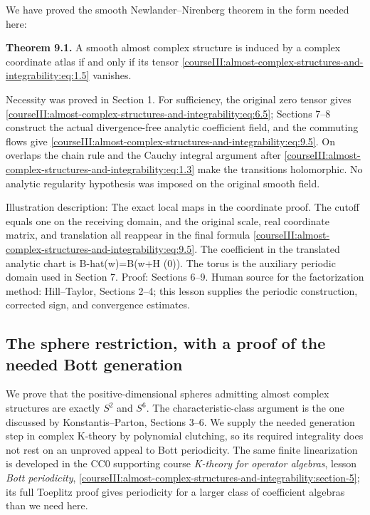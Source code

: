 We have proved the smooth Newlander--Nirenberg theorem in the form needed here:

\textbf{Theorem 9.1.} A smooth almost complex structure is induced by a complex coordinate atlas if and only if its tensor \eqref{courseIII:almost-complex-structures-and-integrability:eq:1.5} vanishes.

Necessity was proved in Section 1. For sufficiency, the original zero tensor gives \eqref{courseIII:almost-complex-structures-and-integrability:eq:6.5}; Sections 7--8 construct the actual divergence-free analytic coefficient field, and the commuting flows give \eqref{courseIII:almost-complex-structures-and-integrability:eq:9.5}. On overlaps the chain rule and the Cauchy integral argument after \eqref{courseIII:almost-complex-structures-and-integrability:eq:1.3} make the transitions holomorphic. No analytic regularity hypothesis was imposed on the original smooth field.

\label{courseIII:almost-complex-structures-and-integrability:integrability-map-figure-style-min-width:900px-max-width:none-width:900px}
Illustration description: The exact local maps in the coordinate proof. The cutoff equals one on the receiving domain, and the original scale, real coordinate matrix, and translation all reappear in the final formula \eqref{courseIII:almost-complex-structures-and-integrability:eq:9.5}. The coefficient in the translated analytic chart is B-hat(w)=B(w+H (0)). The torus is the auxiliary periodic domain used in Section 7. Proof: Sections 6--9. Human source for the factorization method: Hill--Taylor, Sections 2--4; this lesson supplies the periodic construction, corrected sign, and convergence estimates.

\subsection{The sphere restriction, with a proof of the needed Bott generation}
\label{courseIII:almost-complex-structures-and-integrability:sphere-classification}

\label{courseIII:almost-complex-structures-and-integrability:section-10}

We prove that the positive-dimensional spheres admitting almost complex structures are exactly \(S^2\) and \(S^6\). The characteristic-class argument is the one discussed by Konstantis--Parton, Sections 3--6. We supply the needed generation step in complex K-theory by polynomial clutching, so its required integrality does not rest on an unproved appeal to Bott periodicity. The same finite linearization is developed in the CC0 supporting course \emph{K-theory for operator algebras}, lesson \emph{Bott periodicity}, \cref{courseIII:almost-complex-structures-and-integrability:section-5}; its full Toeplitz proof gives periodicity for a larger class of coefficient algebras than we need here.

